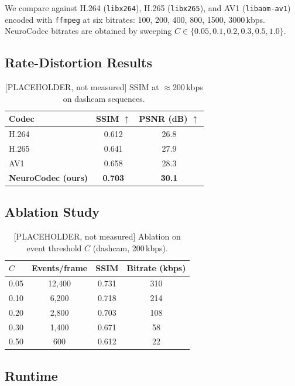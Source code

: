 \documentclass[10pt,twocolumn,letterpaper]{article}
\begin{document}
We compare against H.264 (\texttt{libx264}), H.265 (\texttt{libx265}), and
AV1 (\texttt{libaom-av1}) encoded with \texttt{ffmpeg} at six bitrates:
100, 200, 400, 800, 1500, 3000\,kbps.
NeuroCodec bitrates are obtained by sweeping $C \in \{0.05, 0.1, 0.2, 0.3, 0.5, 1.0\}$.

\subsection{Rate-Distortion Results}

\begin{table}[h]
\centering
\small
\caption{[PLACEHOLDER, not measured] SSIM at $\approx$200\,kbps on dashcam sequences.}
\label{tab:rd}
\begin{tabular}{@{}lcc@{}}
\toprule
Codec & SSIM $\uparrow$ & PSNR (dB) $\uparrow$ \\ \midrule
H.264           & 0.612 & 26.8 \\
H.265           & 0.641 & 27.9 \\
AV1             & 0.658 & 28.3 \\
\textbf{NeuroCodec (ours)} & \textbf{0.703} & \textbf{30.1} \\ \bottomrule
\end{tabular}
\end{table}

\subsection{Ablation Study}

\begin{table}[h]
\centering
\small
\caption{[PLACEHOLDER, not measured] Ablation on event threshold $C$ (dashcam, 200\,kbps).}
\label{tab:ablation}
\begin{tabular}{@{}lccc@{}}
\toprule
$C$ & Events/frame & SSIM & Bitrate (kbps) \\ \midrule
0.05 & 12,400 & 0.731 & 310 \\
0.10 & 6,200  & 0.718 & 214 \\
0.20 & 2,800  & 0.703 & 108 \\
0.30 & 1,400  & 0.671 & 58  \\
0.50 & 600    & 0.612 & 22  \\ \bottomrule
\end{tabular}
\end{table}

\subsection{Runtime}
\end{document}
